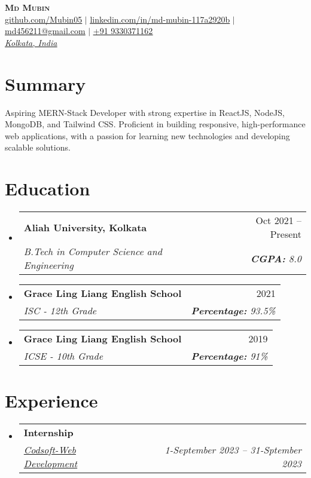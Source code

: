 \documentclass[letterpaper,11pt]{article}
\makeatletter
\newcommand{\resumeSubheading}[4]{\vspace{-2pt}\item\begin{tabular*}{0.97\textwidth}[t]{l@{\extracolsep{\fill}}r}\textbf{#1} & #2 \\ \textit{\small#3} & \textit{\small #4} \\ \end{tabular*}\vspace{-7pt}}
\newcommand{\resumeSubHeadingListStart}{\begin{itemize}[leftmargin=0.15in, label={}]}
\newcommand{\resumeSubHeadingListEnd}{\end{itemize}}
\makeatother
\begin{document}
\begin{center}
    \vspace{10pt}
    \textbf{\Huge \scshape Md Mubin} \\ \vspace{9pt}
    \small 
     \href{https://github.com/Mubin05}{\underline{github.com/Mubin05}} $|$ 
     \href{https://www.linkedin.com/in/md-mubin-117a2920b/}{\underline{linkedin.com/in/md-mubin-117a2920b}} $|$ 
     \href{mailto:md456211@gmail.com}{\underline{md456211@gmail.com}} $|$ 
     \href{tel:+919330371162}{\underline{+91 9330371162}} \\
    \vspace{4pt}
    \textit{\small  {}\href{https://www.google.com/maps/place/Kolkata}{\underline{Kolkata, India}}}
\end{center}

\section{\textbf{Summary}}
\small Aspiring MERN-Stack Developer with strong expertise in ReactJS, NodeJS, MongoDB, and Tailwind CSS. Proficient in building responsive, high-performance web applications, with a passion for learning new technologies and developing scalable solutions.

\section{\textbf{Education}}
\resumeSubHeadingListStart
\resumeSubheading
{Aliah University, Kolkata}{Oct 2021 -- Present}
{B.Tech in Computer Science and Engineering}{\textbf{CGPA:} 8.0}
\resumeSubheading
{Grace Ling Liang English School}{2021}
{ISC - 12th Grade}{\textbf{Percentage:} 93.5\%}
\resumeSubheading
{Grace Ling Liang English School}{2019}
{ICSE - 10th Grade}{\textbf{Percentage:} 91\%}
\resumeSubHeadingListEnd

\section{\textbf{Experience}}
\resumeSubHeadingListStart
\resumeSubheading
{Internship}{}
    {\href{https://drive.google.com/file/d/12l8L6l5aJrcp7j8vJG-pQi-NhOjm5Ci3/view}{Codsoft-Web Development}}{1-September 2023 -- 31-Sptember 2023}
\resumeSubHeadingListEnd

\end{document}
